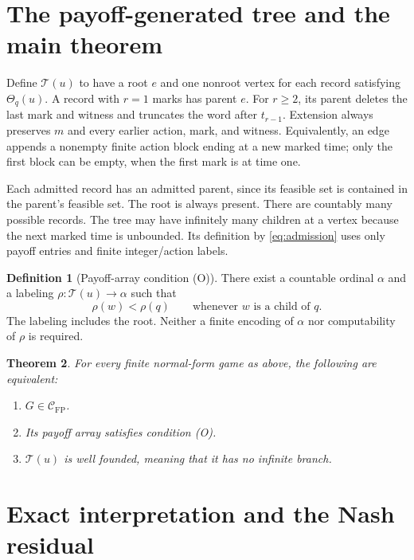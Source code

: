 \documentclass[11pt,a4paper]{article}
\newtheorem{theorem}{Theorem}
\theoremstyle{definition}
\newtheorem{definition}[theorem]{Definition}
\newcommand{\CFP}{\mathcal C_{\mathrm{FP}}}
\begin{document}
\section{The payoff-generated tree and the main theorem}

Define $\mathcal T(u)$ to have a root $e$ and one nonroot vertex for each
record satisfying $\Theta_q(u)$. A record with $r=1$ marks has parent $e$.
For $r\ge2$, its parent deletes the last mark and witness and truncates
the word after $t_{r-1}$. Extension always preserves $m$ and every earlier
action, mark, and witness. Equivalently, an edge appends a nonempty finite
action block ending at a new marked time; only the first block can be empty,
when the first mark is at time one.

Each admitted record has an admitted parent, since its feasible set is
contained in the parent's feasible set. The root is always present.
There are countably many possible records. The tree may have infinitely
many children at a vertex because the next marked time is unbounded.
Its definition by \eqref{eq:admission} uses only payoff entries and finite
integer/action labels.

\begin{definition}[Payoff-array condition (O)]\label{def:O}
There exist a countable ordinal $\alpha$ and a labeling
$\rho:\mathcal T(u)\to\alpha$ such that
\begin{equation}\tag{O}\label{eq:O}
 \rho(w)<\rho(q)\qquad\text{whenever $w$ is a child of $q$}.
\end{equation}
The labeling includes the root. Neither a finite encoding of $\alpha$
nor computability of $\rho$ is required.
\end{definition}

\begin{theorem}\label{thm:main}
For every finite normal-form game as above, the following are equivalent:
\begin{enumerate}[label=\textup{(\roman*)}]
\item $G\in\CFP$.
\item Its payoff array satisfies condition \textup{(O)}.
\item $\mathcal T(u)$ is well founded, meaning that it has no infinite branch.
\end{enumerate}
\end{theorem}

\section{Exact interpretation and the Nash residual}
\end{document}
